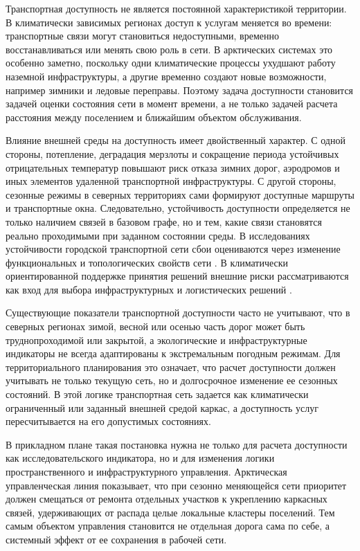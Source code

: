 Транспортная доступность не является постоянной характеристикой территории. В климатически зависимых регионах доступ к услугам меняется во времени: транспортные связи могут становиться недоступными, временно восстанавливаться или менять свою роль в сети. В арктических системах это особенно заметно, поскольку одни климатические процессы ухудшают работу наземной инфраструктуры, а другие временно создают новые возможности, например зимники и ледовые переправы. Поэтому задача доступности становится задачей оценки состояния сети в момент времени, а не только задачей расчета расстояния между поселением и ближайшим объектом обслуживания.

Влияние внешней среды на доступность имеет двойственный характер. С одной стороны, потепление, деградация мерзлоты и сокращение периода устойчивых отрицательных температур повышают риск отказа зимних дорог, аэродромов и иных элементов удаленной транспортной инфраструктуры. С другой стороны, сезонные режимы в северных территориях сами формируют доступные маршруты и транспортные окна. Следовательно, устойчивость доступности определяется не только наличием связей в базовом графе, но и тем, какие связи становятся реально проходимыми при заданном состоянии среды. В исследованиях устойчивости городской транспортной сети сбои оцениваются через изменение функциональных и топологических свойств сети \cite{yin2023transportResilience}. В климатически ориентированной поддержке принятия решений внешние риски рассматриваются как вход для выбора инфраструктурных и логистических решений \cite{rahman2025climateAwareDecision}.

Существующие показатели транспортной доступности часто не учитывают, что в северных регионах зимой, весной или осенью часть дорог может быть труднопроходимой или закрытой, а экологические и инфраструктурные индикаторы не всегда адаптированы к экстремальным погодным режимам. Для территориального планирования это означает, что расчет доступности должен учитывать не только текущую сеть, но и долгосрочное изменение ее сезонных состояний. В этой логике транспортная сеть задается как климатически ограниченный или заданный внешней средой каркас, а доступность услуг пересчитывается на его допустимых состояниях.

В прикладном плане такая постановка нужна не только для расчета
доступности как исследовательского индикатора, но и для изменения логики
пространственного и инфраструктурного управления. Арктическая управленческая линия
показывает, что при сезонно меняющейся сети приоритет должен смещаться от
ремонта отдельных участков к укреплению каркасных связей, удерживающих от
распада целые локальные кластеры поселений. Тем самым объектом управления
становится не отдельная дорога сама по себе, а системный эффект от ее
сохранения в рабочей сети.

